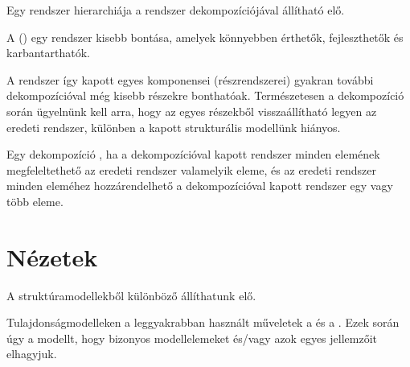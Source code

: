 Egy rendszer hierarchiája a rendszer dekompozíciójával állítható elő.

\begin{definicio}
	A  () egy rendszer kisebb  bontása, amelyek könnyebben érthetők, fejleszthetők és karbantarthatók.
\end{definicio}

A rendszer így kapott egyes komponensei (részrendszerei) gyakran további dekompozícióval még kisebb részekre bonthatóak. Természetesen a dekompozíció során ügyelnünk kell arra, hogy az egyes részekből visszaállítható legyen az eredeti rendszer, különben a kapott strukturális modellünk hiányos.

\begin{definicio}
	Egy dekompozíció , ha a dekompozícióval kapott rendszer minden elemének megfeleltethető az eredeti rendszer valamelyik eleme, és az eredeti rendszer minden eleméhez hozzárendelhető a dekompozícióval kapott rendszer egy vagy több eleme.
\end{definicio}
















\section{Nézetek}

A struktúramodellekből különböző  állíthatunk elő.

Tulajdonságmodelleken a leggyakrabban használt műveletek a  és a . Ezek során úgy  a modellt, hogy bizonyos modellelemeket és/vagy azok egyes jellemzőit elhagyjuk.

